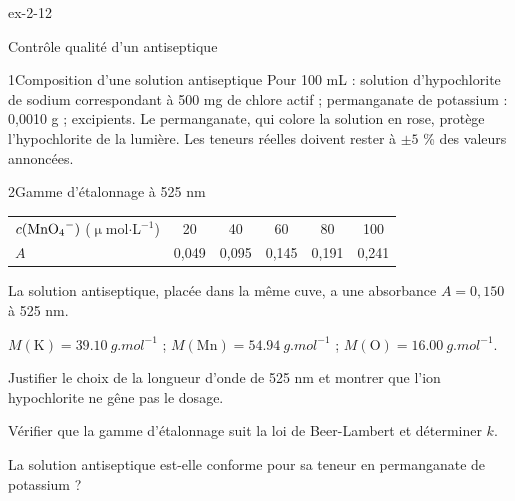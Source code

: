 \begin{blocLivre}{ex-2-12}
\begin{exercice}[3]{Contrôle qualité d'un antiseptique}
\begin{docu}{1}{Composition d'une solution antiseptique}
Pour 100 mL : solution d'hypochlorite de sodium correspondant à 500 mg de chlore actif ; permanganate de
potassium  : 0,0010 g ; excipients. Le permanganate, qui colore la solution en rose, protège
l'hypochlorite de la lumière. Les teneurs réelles doivent rester à $\pm5$ \% des valeurs annoncées.
\end{docu}
\begin{docu}{2}{Gamme d'étalonnage à 525 nm}
\centering\small\renewcommand{\arraystretch}{1.15}
\begin{tabular}{@{}l*{5}{c}@{}}
$c(\ce{MnO4-})$ ($\upmu$mol$\cdot$L$^{-1}$) & 20 & 40 & 60 & 80 & 100\\
$A$ & 0,049 & 0,095 & 0,145 & 0,191 & 0,241
\end{tabular}\par\raggedright
La solution antiseptique, placée dans la même cuve, a une absorbance $A=0{,}150$ à 525 nm.
\end{docu}
\begin{donnees}
$M(\mathrm{K})=\qty{39,10}{g.mol^{-1}}$ ; $M(\mathrm{Mn})=\qty{54,94}{g.mol^{-1}}$ ; $M(\mathrm{O})=\qty{16,00}{g.mol^{-1}}$.
\end{donnees}
\begin{questions}
\item Justifier le choix de la longueur d'onde de 525 nm et montrer que l'ion hypochlorite ne gêne pas le dosage.
\item Vérifier que la gamme d'étalonnage suit la loi de Beer-Lambert et déterminer $k$.
\item \initiative La solution antiseptique est-elle conforme pour sa teneur en permanganate de potassium ?
\end{questions}
\end{exercice}
\end{blocLivre}
